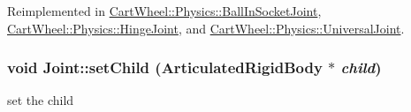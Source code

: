 Reimplemented in \hyperlink{classCartWheel_1_1Physics_1_1BallInSocketJoint_af1a97e525c526eac4b346d5e305ebb9c}{CartWheel::Physics::BallInSocketJoint}, \hyperlink{classCartWheel_1_1Physics_1_1HingeJoint_a1e8d5fd7165a0cc0d669775ac95ab53f}{CartWheel::Physics::HingeJoint}, and \hyperlink{classCartWheel_1_1Physics_1_1UniversalJoint_a2b5b26135ffc93f34b26e1b0c35e7405}{CartWheel::Physics::UniversalJoint}.

\hypertarget{classCartWheel_1_1Physics_1_1Joint_a5b08a6c1d549bdb45362d630a79d2e79}{
\subsubsection[{setChild}]{\setlength{\rightskip}{0pt plus 5cm}void Joint::setChild ({\bf ArticulatedRigidBody} $\ast$ {\em child})}}
\label{classCartWheel_1_1Physics_1_1Joint_a5b08a6c1d549bdb45362d630a79d2e79}
set the child

